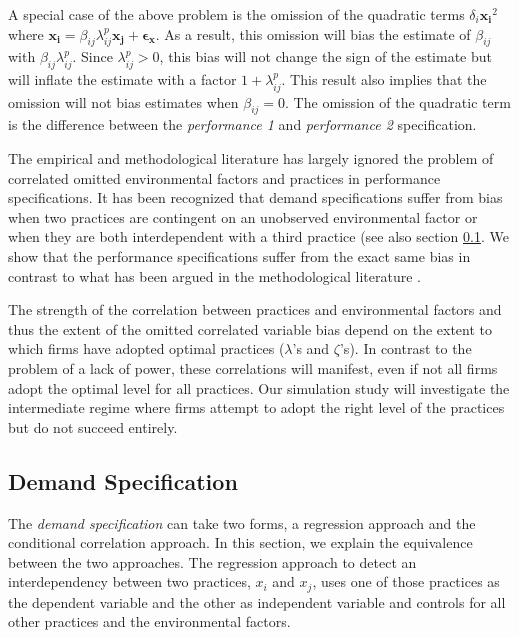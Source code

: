 \documentclass[12pt]{article}
\begin{document}
A special case of the above problem is the omission of the quadratic terms $\delta_i \mathbf{x_i}^2$ where $\mathbf{x_i} =  \beta_{ij} \lambda^p_{ij} \mathbf{x_j} + \mathbf{\epsilon_x}$. As a result, this omission will bias the estimate of $\beta_{ij}$ with $\beta_{ij} \lambda^p_{ij}$. Since $\lambda^p_{ij} > 0$, this bias will not change the sign of the estimate but will inflate the estimate with a factor $1 + \lambda^p_{ij}$.  This result also implies that the omission will not bias estimates when $\beta_{ij} = 0$. The omission of the quadratic term is the difference between the \emph{performance 1} and \emph{performance 2} specification.

The empirical and methodological literature has largely ignored the problem of correlated omitted environmental factors and practices in performance specifications. It has been recognized that demand specifications suffer from bias when two practices are contingent on an unobserved environmental factor or when they are both interdependent with a third practice (see also section \ref{demand-specification}. We show that the performance specifications suffer from the exact same bias in contrast to what has been argued in the methodological literature \citep{Carree2011}. 

The strength of the correlation between practices and environmental factors and thus the extent of the omitted correlated variable bias depend on the extent to which firms have adopted optimal practices ($\lambda$'s and $\zeta$'s). In contrast to the problem of a lack of power, these correlations will manifest, even if not all firms adopt the optimal level for all practices. Our simulation study will investigate the intermediate regime where firms attempt to adopt the right level of the practices but do not succeed entirely.

\subsection{Demand Specification}\label{demand-specification}

The \emph{demand specification} can take two forms, a regression approach and the conditional correlation approach. In this section, we explain the equivalence between the two approaches. The regression  approach to detect an interdependency between two practices, $x_i$ and $x_j$, uses one of those practices as the dependent variable and the other as independent variable and controls for all other practices and the environmental factors.
\end{document}
